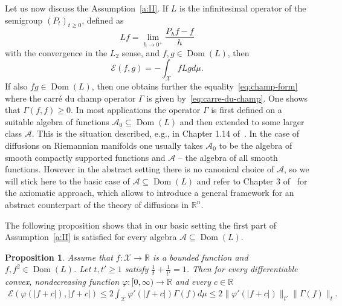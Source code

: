 \documentclass[a4paper]{amsart}
\newtheorem{proposition}[theorem]{Proposition} %
\theoremstyle{definition}
\theoremstyle{remark}
\numberwithin{equation}{section}
\newcommand*{\RR}{\mathbb{R}}
\newcommand{\calX}{\mathcal{X}}
\newcommand*{\calA}{\mathcal{A}}
\DeclareMathOperator{\Dom}{Dom} %
\newcommand*{\calE}{\mathcal{E}}
\begin{document}
Let us now discuss the Assumption~\ref{a:II}. If $L$ is the infinitesimal operator of the semigroup $(P_t)_{t\ge 0}$, defined as
\begin{displaymath}
  Lf = \lim_{h\to 0^+} \frac{P_h f - f}{h}
\end{displaymath}
with the convergence in the $L_2$ sense, and $f,g \in \Dom(L)$, then
\begin{displaymath}
  \calE(f,g) = -\int_\calX fLg d\mu.
\end{displaymath}
If also $fg \in \Dom(L)$, then one obtains further the equality~\eqref{eq:champ-form} where the carr\'e du champ operator $\Gamma$ is given by~\eqref{eq:carre-du-champ}. One shows that $\Gamma(f,f) \ge 0$.
In most applications the operator $\Gamma$ is first defined on a suitable algebra of functions $\calA_0 \subseteq \Dom(L)$ and then extended to some larger class $\calA$. This is the situation described, e.g., in Chapter 1.14 of~\cite{MR3155209}. In the case of diffusions on Riemannian manifolds one usually takes $\calA_0$ to be the algebra of smooth compactly supported functions and $\calA$ -- the algebra of all smooth functions. However in the abstract setting there is no canonical choice of $\calA$, so we will stick here to the basic case of $\calA \subseteq \Dom(L)$ and refer to Chapter 3 of~\cite{MR3155209} for the axiomatic approach, which allows to introduce a general framework for an abstract counterpart of the theory of diffusions in $\RR^n$.

The following proposition shows that in our basic setting the first part of Assumption~\ref{a:II} is satisfied for every algebra $\calA \subseteq \Dom(L)$.

\begin{proposition}\label{prop:assumption-2-1} Assume that $f\colon \calX \to \RR$ is a bounded function and $f, f^2\in \Dom(L)$. Let $t,t' \ge 1$ satisfy $\frac{1}{t} + \frac{1}{t'} = 1$. Then for every differentiable convex, nondecreasing function $\varphi \colon [0,\infty) \to \RR$ and every $c \in \RR$
\begin{align*}
\calE(\varphi(|f+c|),|f+c|) \le 2\int_\calX \varphi'(|f+c|) \Gamma(f) d\mu \le 2\Big\|\varphi'(|f+c|)\Big\|_{t'}\Big\|\Gamma(f)\Big\|_t.
\end{align*}
\end{proposition}
\end{document}
